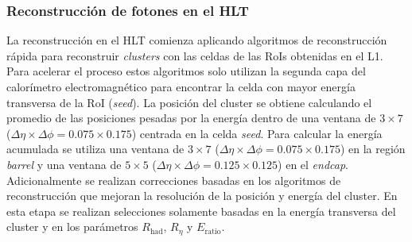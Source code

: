 \subsubsection{Reconstrucción de fotones en el HLT}

La reconstrucción en el HLT comienza aplicando algoritmos de reconstrucción rápida para reconstruir \textit{clusters} con las celdas de las RoIs obtenidas en el L1. Para acelerar el proceso estos algoritmos solo utilizan la segunda capa del calorímetro electromagnético para encontrar la celda con mayor energía transversa de la RoI (\textit{seed}). La posición del cluster se obtiene calculando el
promedio de las posiciones pesadas por la energía
dentro de una ventana de $3\times7$ ($\Delta\eta\times\Delta\phi = 0.075\times0.175$) centrada en la celda \textit{seed}. Para calcular la energía acumulada 
se utiliza una ventana de $3\times7$ ($\Delta\eta\times\Delta\phi = 0.075\times0.175$) en la región \textit{barrel} y una ventana de $5\times5$ ($\Delta\eta\times\Delta\phi = 0.125\times0.125$) en el \textit{endcap}. Adicionalmente se realizan correcciones basadas en los algoritmos de reconstrucción que mejoran la resolución de la posición y energía del cluster. En esta etapa se realizan selecciones solamente basadas en la energía transversa del cluster y en los parámetros $R_{\text{had}}$, $R_{\eta}$ y $E_{\text{ratio}}$.


